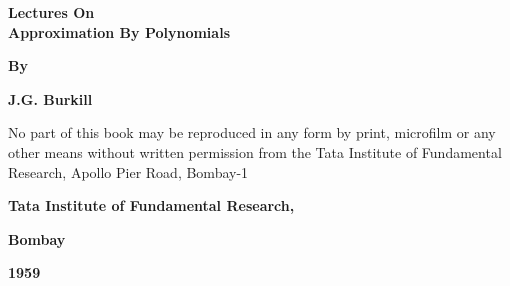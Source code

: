 \thispagestyle{empty}
\begin{center}
{\Large\bf Lectures On} \\[5pt]
{\Large\bf Approximation By Polynomials}\\[50pt]
\vskip 1cm

{\bf  By}
\medskip


{\large\bf  J.G. Burkill}
\vfill
  
\parbox{0.7\textwidth}{No part of this book may be reproduced in any form by print,
microfilm or any other means without written permission from the
Tata Institute of Fundamental Research, Apollo Pier Road, Bombay-1}
\vfill


{\bf Tata Institute of Fundamental Research,}

{\bf  Bombay}

{\bf  1959}
\end{center}
